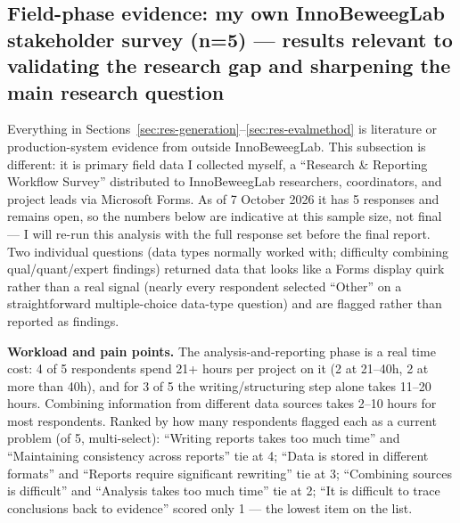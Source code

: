 \subsection{Field-phase evidence: my own InnoBeweegLab stakeholder survey (n=5) — results relevant to validating the research gap and sharpening the main research question}\label{sec:res-survey}

Everything in Sections~\ref{sec:res-generation}--\ref{sec:res-evalmethod} is literature or production-system evidence from outside InnoBeweegLab. This subsection is different: it is primary field data I collected myself, a \textquotedblleft{}Research \& Reporting Workflow Survey\textquotedblright{} distributed to InnoBeweegLab researchers, coordinators, and project leads via Microsoft Forms. As of 7 October 2026 it has 5 responses and remains open, so the numbers below are indicative at this sample size, not final — I will re-run this analysis with the full response set before the final report. Two individual questions (data types normally worked with; difficulty combining qual/quant/expert findings) returned data that looks like a Forms display quirk rather than a real signal (nearly every respondent selected \textquotedblleft{}Other\textquotedblright{} on a straightforward multiple-choice data-type question) and are flagged rather than reported as findings.



\textbf{Workload and pain points.} The analysis-and-reporting phase is a real time cost: 4 of 5 respondents spend 21+ hours per project on it (2 at 21–40h, 2 at more than 40h), and for 3 of 5 the writing/structuring step alone takes 11–20 hours. Combining information from different data sources takes 2–10 hours for most respondents. Ranked by how many respondents flagged each as a current problem (of 5, multi-select): \textquotedblleft{}Writing reports takes too much time\textquotedblright{} and \textquotedblleft{}Maintaining consistency across reports\textquotedblright{} tie at 4; \textquotedblleft{}Data is stored in different formats\textquotedblright{} and \textquotedblleft{}Reports require significant rewriting\textquotedblright{} tie at 3; \textquotedblleft{}Combining sources is difficult\textquotedblright{} and \textquotedblleft{}Analysis takes too much time\textquotedblright{} tie at 2; \textquotedblleft{}It is difficult to trace conclusions back to evidence\textquotedblright{} scored only 1 — the lowest item on the list.



